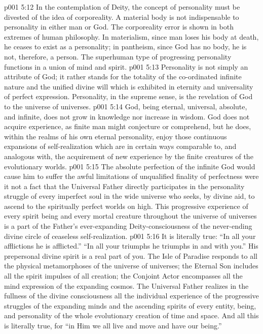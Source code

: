 \vs p001 5:12 In the contemplation of Deity, the concept of personality must be divested of the idea of corporeality. A material body is not indispensable to personality in either man or God. The corporeality error is shown in both extremes of human philosophy. In materialism, since man loses his body at death, he ceases to exist as a personality; in pantheism, since God has no body, he is not, therefore, a person. The superhuman type of progressing personality functions in a union of mind and spirit.
\vs p001 5:13 \pc Personality is not simply an attribute of God; it rather stands for the totality of the co\hyp{}ordinated infinite nature and the unified divine will which is exhibited in eternity and universality of perfect expression. Personality, in the supreme sense, is the revelation of God to the universe of universes.
\vs p001 5:14 \pc God, being eternal, universal, absolute, and infinite, does not grow in knowledge nor increase in wisdom. God does not acquire experience, as finite man might conjecture or comprehend, but he does, within the realms of his own eternal personality, enjoy those continuous expansions of self\hyp{}realization which are in certain ways comparable to, and analogous with, the acquirement of new experience by the finite creatures of the evolutionary worlds.
\vs p001 5:15 The absolute perfection of the infinite God would cause him to suffer the awful limitations of unqualified finality of perfectness were it not a fact that the Universal Father directly participates in the personality struggle of every imperfect soul in the wide universe who seeks, by divine aid, to ascend to the spiritually perfect worlds on high. This progressive experience of every spirit being and every mortal creature throughout the universe of universes is a part of the Father’s ever\hyp{}expanding Deity\hyp{}consciousness of the never\hyp{}ending divine circle of ceaseless self\hyp{}realization.
\vs p001 5:16 It is literally true: “In all your afflictions he is afflicted.” “In all your triumphs he triumphs in and with you.” His prepersonal divine spirit is a real part of you. The Isle of Paradise responds to all the physical metamorphoses of the universe of universes; the Eternal Son includes all the spirit impulses of all creation; the Conjoint Actor encompasses all the mind expression of the expanding cosmos. The Universal Father realizes in the fullness of the divine consciousness all the individual experience of the progressive struggles of the expanding minds and the ascending spirits of every entity, being, and personality of the whole evolutionary creation of time and space. And all this is literally true, for “in Him we all live and move and have our being.”
